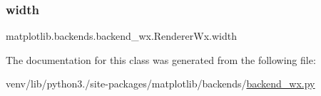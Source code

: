 \mbox{\label{classmatplotlib_1_1backends_1_1backend__wx_1_1RendererWx_ade12cd0552dc96e33cea8d14b4831436}} 
\subsubsection{\texorpdfstring{width}{width}}
{\footnotesize\ttfamily matplotlib.\+backends.\+backend\+\_\+wx.\+Renderer\+Wx.\+width}



The documentation for this class was generated from the following file\+:\begin{DoxyCompactItemize}
\item 
venv/lib/python3./site-\/packages/matplotlib/backends/\hyperlink{backend__wx_8py}{backend\+\_\+wx.\+py}\end{DoxyCompactItemize}
